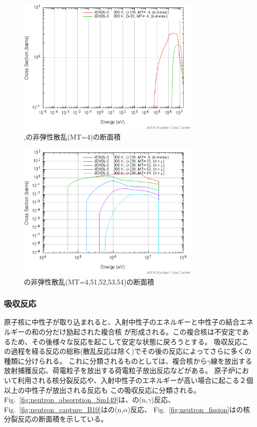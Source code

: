 \begin{figure}[htbp]
  \centering
  \includegraphics[width=0.8\textwidth]{figure/U238Zr90Inela.eps}
  \caption{,の非弾性散乱(MT=4)の断面積}
  \label{fig:neutron_inelastic_scattering}
\end{figure}

\begin{figure}[htbp]
  \centering
  \includegraphics[width=0.8\textwidth]{figure/U238Inela_nx.eps}
  \caption{の非弾性散乱(MT=4,51,52,53,54)の断面積}
  \label{fig:neutron_inelastic_scattering_U238}
\end{figure}


\subsubsection{吸収反応}
原子核に中性子が取り込まれると、入射中性子のエネルギーと中性子の結合エネルギーの和の分だけ励起された複合核
が形成される。この複合核は不安定であるため、その後様々な反応を起こして安定な状態に戻ろうとする。
吸収反応この過程を経る反応の総称(散乱反応は除く)でその後の反応によってさらに多くの種類に分けられる。
これに分類されるものとしては、複合核から$\gamma$線を放出する放射捕獲反応、荷電粒子を放出する荷電粒子放出反応などがある。
原子炉において利用される核分裂反応や、入射中性子のエネルギーが高い場合に起こる２個以上の中性子が放出される反応も
この吸収反応に分類される。
Fig.~\ref{fig:neutron_absorption_Sm149}は、の(n,$\gamma$)反応、
Fig.~\ref{fig:neutron_capture_B10}はの(n,$\alpha$)反応、
Fig.~\ref{fig:neutron_fission}はの核分裂反応の断面積を示している。

